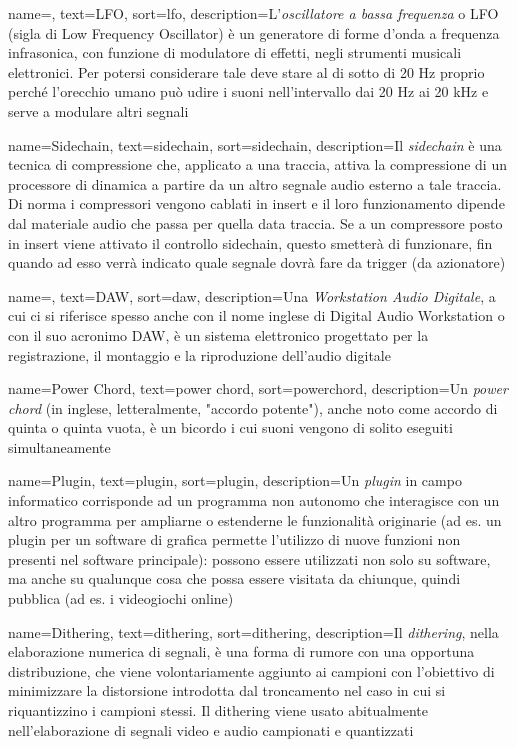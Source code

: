 {
    name=,
    text=LFO,
    sort=lfo,
    description={L'\textit{oscillatore a bassa frequenza} o LFO (sigla di Low Frequency Oscillator) è un generatore di forme d'onda a frequenza infrasonica, con funzione di modulatore di effetti, negli strumenti musicali elettronici. Per potersi considerare tale deve stare al di sotto di 20 Hz proprio perché l'orecchio umano può udire i suoni nell'intervallo dai 20 Hz ai 20 kHz e serve a modulare altri segnali}
}

{
    name=Sidechain,
    text=sidechain,
    sort=sidechain,
    description={Il \textit{sidechain} è una tecnica di compressione che, applicato a una traccia, attiva la compressione di un processore di dinamica a partire da un altro segnale audio esterno a tale traccia. Di norma i compressori vengono cablati in insert e il loro funzionamento dipende dal materiale audio che passa per quella data traccia. Se a un compressore posto in insert viene attivato il controllo sidechain, questo smetterà di funzionare, fin quando ad esso verrà indicato quale segnale dovrà fare da trigger (da azionatore)}
}

{
    name=,
    text=DAW,
    sort=daw,
    description={Una \textit{Workstation Audio Digitale}, a cui ci si riferisce spesso anche con il nome inglese di Digital Audio Workstation o con il suo acronimo DAW, è un sistema elettronico progettato per la registrazione, il montaggio e la riproduzione dell'audio digitale}
}

{
    name=Power Chord,
    text=power chord,
    sort=powerchord,
    description={Un \textit{power chord} (in inglese, letteralmente, "accordo potente"), anche noto come accordo di quinta o quinta vuota, è un bicordo i cui suoni vengono di solito eseguiti simultaneamente}
}

{
    name=Plugin,
    text=plugin,
    sort=plugin,
    description={Un \textit{plugin} in campo informatico corrisponde ad un programma non autonomo che interagisce con un altro programma per ampliarne o estenderne le funzionalità originarie (ad es. un plugin per un software di grafica permette l'utilizzo di nuove funzioni non presenti nel software principale): possono essere utilizzati non solo su software, ma anche su qualunque cosa che possa essere visitata da chiunque, quindi pubblica (ad es. i videogiochi online)}
}

{
    name=Dithering,
    text=dithering,
    sort=dithering,
    description={Il \textit{dithering}, nella elaborazione numerica di segnali, è una forma di rumore con una opportuna distribuzione, che viene volontariamente aggiunto ai campioni con l'obiettivo di minimizzare la distorsione introdotta dal troncamento nel caso in cui si riquantizzino i campioni stessi. Il dithering viene usato abitualmente nell'elaborazione di segnali video e audio campionati e quantizzati}
}

